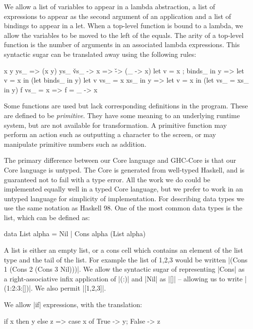 We allow a list of variables to appear in a lambda abstraction, a list of expressions to appear as the second argument of an application and a list of bindings to appear in a let. When a top-level function is bound to a lambda, we allow the variables to be moved to the left of the equals. The arity of a top-level function is the number of arguments in an associated lambda expressions. This syntactic sugar can be translated away using the following rules:

\begin{code}
x y ys_                  => (x y) ys_
\v vs_ -> x              => \v -> (\vs_ -> x)
let v = x ; binds_ in y  => let v = x in (let binds_ in y)
let v vs_ = x xs_ in y   => let v = x in (let vs_ = xs_ in y)
f vs_ = x                => f = \vs_ -> x
\end{code}

Some functions are used but lack corresponding definitions in the program. These are defined to be \textit{primitive}. They have some meaning to an underlying runtime system, but are not available for transformation. A primitive function may perform an action such as outputting a character to the screen, or may manipulate primitive numbers such as addition.

The primary difference between our Core language and GHC-Core \cite{ghc_core} is that our Core language is untyped. The Core is generated from well-typed Haskell, and is guaranteed not to fail with a type error. All the work we do could be implemented equally well in a typed Core language, but we prefer to work in an untyped language for simplicity of implementation. For describing data types we use the same notation as Haskell 98. One of the most common data types is the list, which can be defined as:

\begin{code}
data List alpha = Nil | Cons alpha (List alpha)
\end{code}

A list is either an empty list, or a cons cell which contains an element of the list type and the tail of the list. For example the list of 1,2,3 would be written |(Cons 1 (Cons 2 (Cons 3 Nil)))|. We allow the syntactic sugar of representing |Cons| as a right-associative infix application of |(:)| and |Nil| as |[]| -- allowing us to write |(1:2:3:[])|. We also permit |[1,2,3]|.

We allow |if| expressions, with the translation:

\begin{code}
if x then y else z => case x of {True -> y; False -> z}
\end{code}


